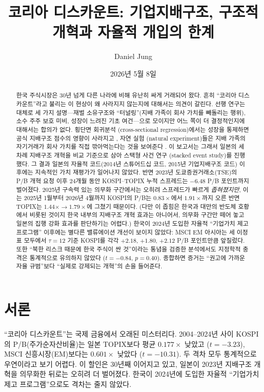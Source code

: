 \documentclass[12pt]{article}
\title{코리아 디스카운트: 기업지배구조, 구조적 개혁과 자율적 개입의 한계}
\author{Daniel Jung}
\date{2026년 5월 8일}
\begin{document}
\maketitle

\begin{abstract}
한국 주식시장은 30년 넘게 다른 나라에 비해 유난히 싸게 거래되어 왔다. 흔히 ``코리아 디스카운트''라고 불리는 이 현상이 왜 사라지지 않는지에 대해서는 의견이 갈린다. 선행 연구는 대체로 세 가지 설명---재벌 소유구조와 ``터널링''(지배 가족이 회사 가치를 빼돌리는 행위), 소수 주주 보호 미비, 성장이 느려진 기초 여건---으로 모이지만 어느 쪽이 더 결정적인지에 대해서는 합의가 없다. 횡단면 회귀분석 (cross-sectional regression)에서는 성장을 통제하면 공식 지배구조 점수의 영향이 사라지고 \citep{yang2025korea}, 자연 실험 (natural experiment)들은 지배 가족의 자기거래가 회사 가치를 직접 깎아먹는다는 것을 보여준다 \citep{black2015governance}. 이 보고서는 그래서 일본의 세 차례 지배구조 개혁을 비교 기준으로 삼아 스택형 사건 연구 (stacked event study)를 진행했다. 그 결과 일본의 자율적 코드(2014년 스튜어드십 코드, 2015년 기업지배구조 코드) 이후에는 지속적인 가치 재평가가 일어나지 않았다. 반면 2023년 도쿄증권거래소(TSE)의 P/B 개혁 요청 이후 24개월 동안 KOSPI--TOPIX 누적 스프레드는 $-6.48$ P/B 포인트까지 벌어졌다. 2025년 구속력 있는 의무화 구간에서는 오히려 스프레드가 빠르게 \emph{좁혀졌지만}, 이는 2025년 1월부터 2026년 4월까지 KOSPI의 P/B는 $0.83\times$에서 $1.91\times$까지 오른 반면 TOPIX는 $1.44\times \to 1.79\times$에 그쳤기 때문이다. (다만 이 좁힘은 한국과 대만의 반도체 호황에서 비롯된 것이지 한국 내부의 지배구조 개혁 효과는 아니어서, 의무화 구간만 떼어 놓고 일본의 집행 강화 효과를 판단하기는 어렵다.) 한국이 2024년 도입한 자율적 ``기업가치 제고 프로그램'' 이후에는 별다른 밸류에이션 개선이 보이지 않았다: MSCI EM 아시아는 세 이정표 모두에서 $\tau=12$ 기준 KOSPI를 각각 $+2.18$, $+1.80$, $+2.12$ P/B 포인트만큼 앞질렀다. 또한 ``북한 리스크 때문에 한국 주식이 싼 것''이라는 통념을 검증한 분석에서도 지정학적 충격은 통계적으로 유의하지 않았다 ($t=-0.84$, $p=0.40$). 종합하면 증거는 ``권고에 가까운 자율 규범''보다 ``실제로 강제되는 개혁''의 손을 들어준다.
\end{abstract}

\section{서론}
\label{sec:intro}

``코리아 디스카운트''는 국제 금융에서 오래된 미스터리다. 2004--2024년 사이 KOSPI의 P/B(주가순자산비율)는 일본 TOPIX보다 평균 $0.177\times$ 낮았고 ($t=-3.23$), MSCI 신흥시장(EM)보다는 $0.601\times$ 낮았다 ($t=-10.31$). 두 격차 모두 통계적으로 우연이라고 보기 어렵다. 이 할인은 30년째 이어지고 있고, 일본이 2023년 지배구조 개혁을 의무화한 뒤로는 오히려 더 벌어졌다. 한국이 2024년에 도입한 자율적 ``기업가치 제고 프로그램''으로도 격차는 줄지 않았다.
\end{document}
